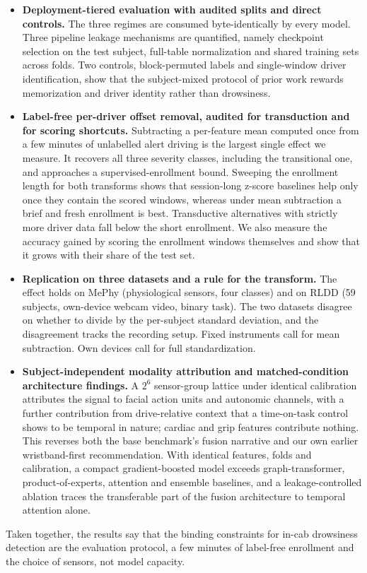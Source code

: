 \documentclass[journal]{IEEEtran}
\begin{document}
\begin{itemize}
\item \textbf{Deployment-tiered evaluation with audited splits and direct
controls.} The three regimes are consumed byte-identically by every model.
Three pipeline leakage mechanisms are quantified, namely checkpoint selection
on the test subject, full-table normalization and shared training sets across
folds. Two controls, block-permuted labels and single-window driver
identification, show that the subject-mixed protocol of prior work rewards
memorization and driver identity rather than drowsiness.
\item \textbf{Label-free per-driver offset removal, audited for transduction
and for scoring shortcuts.} Subtracting a per-feature mean computed once from
a few minutes of unlabelled alert driving is the largest single effect we
measure. It recovers all three severity classes, including the transitional
one, and approaches a supervised-enrollment bound. Sweeping the enrollment
length for both transforms shows that session-long z-score baselines help
only once they contain the scored windows, whereas under mean subtraction a
brief and fresh enrollment is best. Transductive alternatives with strictly
more driver data fall below the short enrollment. We also measure the accuracy
gained by scoring the enrollment windows themselves and show that it grows
with their share of the test set.
\item \textbf{Replication on three datasets and a rule for the transform.}
The effect holds on MePhy (physiological sensors, four classes) and on RLDD
(59 subjects, own-device webcam video, binary task). The two datasets disagree
on whether to divide by the per-subject standard deviation, and the
disagreement tracks the recording setup. Fixed instruments call for mean
subtraction. Own devices call for full standardization.
\item \textbf{Subject-independent modality attribution and matched-condition
architecture findings.} A $2^{6}$ sensor-group lattice under identical
calibration attributes the signal to facial action units and autonomic
channels, with a further contribution from drive-relative context that a
time-on-task control shows to be temporal in nature; cardiac and grip features
contribute nothing. This reverses both the base benchmark's fusion narrative
and our own earlier wristband-first recommendation. With identical features,
folds and calibration, a compact gradient-boosted model exceeds
graph-transformer, product-of-experts, attention and ensemble baselines, and a
leakage-controlled ablation traces the transferable part of the fusion
architecture to temporal attention alone.
\end{itemize}
Taken together, the results say that the binding constraints for in-cab
drowsiness detection are the evaluation protocol, a few minutes of label-free
enrollment and the choice of sensors, not model capacity.
\end{document}
